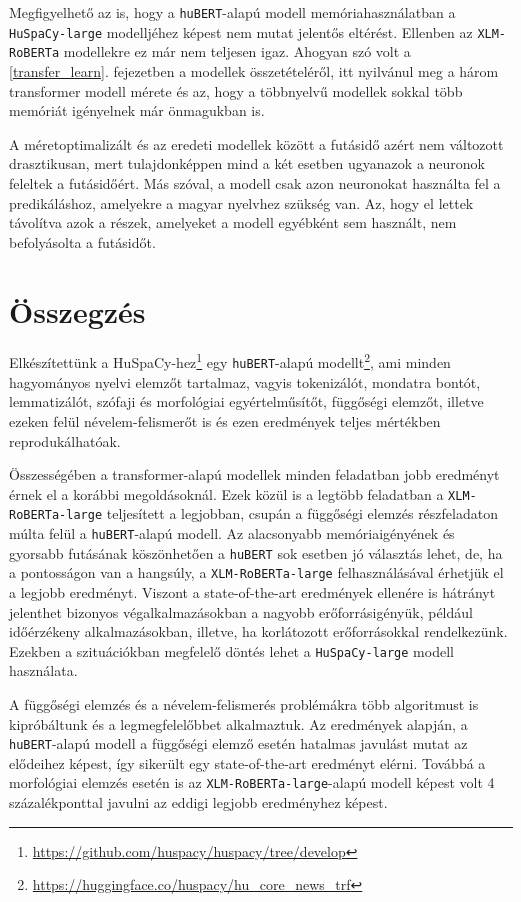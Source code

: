 \documentclass{llncs}
\newcommand{\hubert}{\texttt{huBERT}}
\newcommand{\huspacyl}{\texttt{HuSpaCy-large}}
\newcommand{\roberta}{\texttt{XLM-RoBERTa}}
\newcommand{\robertaL}{\texttt{XLM-RoBERTa-large}}
\newcommand{\huspacy}{HuSpaCy}
\newcommand{\trf}{transformer}
\begin{document}
Megfigyelhető az is, hogy a \hubert{}-alapú modell memóriahasználatban a \huspacyl{} modelljéhez képest nem mutat jelentős eltérést. Ellenben az \roberta{} modellekre ez már nem teljesen igaz. Ahogyan szó volt a \ref{transfer_learn}. fejezetben a modellek összetételéről, itt nyilvánul meg a három \trf{} modell mérete és az, hogy a többnyelvű modellek sokkal több memóriát igényelnek már önmagukban is.

A méretoptimalizált és az eredeti modellek között a futásidő azért nem változott drasztikusan, mert tulajdonképpen mind a két esetben ugyanazok a neuronok feleltek a futásidőért. Más szóval, a modell csak azon neuronokat használta fel a predikáláshoz, amelyekre a magyar nyelvhez szükség van. Az, hogy el lettek távolítva azok a részek, amelyeket a modell egyébként sem használt, nem befolyásolta a futásidőt.

\section{Összegzés}

Elkészítettünk a \huspacy{}-hez\footnote{\url{https://github.com/huspacy/huspacy/tree/develop}} egy \hubert{}-alapú %
modellt\footnote{\url{https://huggingface.co/huspacy/hu_core_news_trf}}, ami minden
hagyományos nyelvi elemzőt tartalmaz, vagyis tokenizálót, mondatra bontót, lemmatizálót, szófaji és morfológiai egyértelműsítőt, függőségi elemzőt, illetve ezeken felül névelem-felismerőt is és ezen eredmények teljes mértékben reprodukálhatóak. 

Összességében a \trf{}-alapú modellek minden feladatban jobb eredményt érnek el a korábbi megoldásoknál. Ezek közül is a legtöbb feladatban a \robertaL{} teljesített a legjobban, csupán a függőségi elemzés részfeladaton múlta felül a \hubert{}-alapú modell. Az alacsonyabb memóriaigényének és gyorsabb futásának köszönhetően a \hubert{} sok esetben jó választás lehet, de, ha a pontosságon van a hangsúly, a \robertaL{} felhasználásával érhetjük el a legjobb eredményt.
Viszont a state-of-the-art eredmények ellenére is hátrányt jelenthet bizonyos végalkalmazásokban a nagyobb erőforrásigényük, például időérzékeny alkalmazásokban, illetve, ha korlátozott erőforrásokkal rendelkezünk. Ezekben a szituációkban megfelelő döntés lehet a \huspacyl{} modell használata.

A függőségi elemzés és a névelem-felismerés problémákra több algoritmust is kipróbáltunk és a legmegfelelőbbet alkalmaztuk. Az eredmények alapján, a \hubert{}-alapú modell a függőségi elemző esetén hatalmas javulást mutat az elődeihez képest, így sikerült egy state-of-the-art eredményt elérni. Továbbá a morfológiai elemzés esetén is az \robertaL{}-alapú modell képest volt 4 százalékponttal javulni az eddigi legjobb eredményhez képest.
\end{document}
